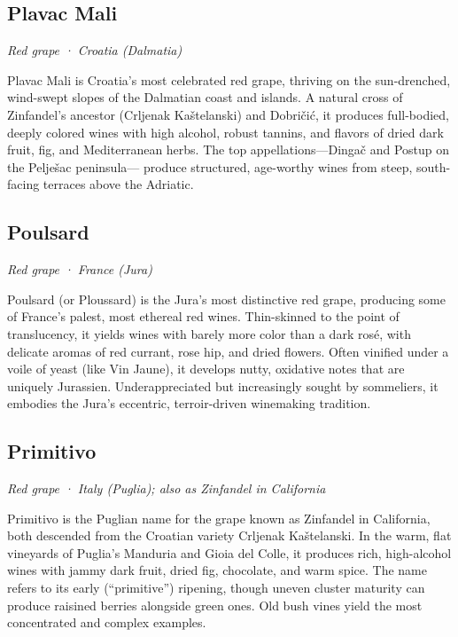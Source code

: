 \subsection*{Plavac Mali}
\textit{Red grape · Croatia (Dalmatia)}\par\smallskip

Plavac Mali is Croatia’s most celebrated red grape, thriving on the sun-drenched, wind-swept slopes of the Dalmatian coast and islands. A natural cross of Zinfandel’s ancestor (Crljenak Kaštelanski) and Dobričić, it produces full-bodied, deeply colored wines with high alcohol, robust tannins, and flavors of dried dark fruit, fig, and Mediterranean herbs. The top appellations—Dingač and Postup on the Pelješac peninsula— produce structured, age-worthy wines from steep, south-facing terraces above the Adriatic.

\subsection*{Poulsard}
\textit{Red grape · France (Jura)}\par\smallskip

Poulsard (or Ploussard) is the Jura’s most distinctive red grape, producing some of France’s palest, most ethereal red wines. Thin-skinned to the point of translucency, it yields wines with barely more color than a dark rosé, with delicate aromas of red currant, rose hip, and dried flowers. Often vinified under a voile of yeast (like Vin Jaune), it develops nutty, oxidative notes that are uniquely Jurassien. Underappreciated but increasingly sought by sommeliers, it embodies the Jura’s eccentric, terroir-driven winemaking tradition.

\subsection*{Primitivo}
\textit{Red grape · Italy (Puglia); also as Zinfandel in California}\par\smallskip

Primitivo is the Puglian name for the grape known as Zinfandel in California, both descended from the Croatian variety Crljenak Kaštelanski. In the warm, flat vineyards of Puglia’s Manduria and Gioia del Colle, it produces rich, high-alcohol wines with jammy dark fruit, dried fig, chocolate, and warm spice. The name refers to its early (“primitive”) ripening, though uneven cluster maturity can produce raisined berries alongside green ones. Old bush vines yield the most concentrated and complex examples.


